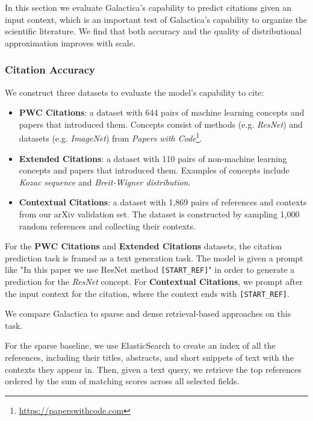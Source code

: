  In this section we evaluate Galactica's capability to predict citations given an input context, which is an important test of Galactica's capability to organize the scientific literature. We find that both accuracy and the quality of distributional approximation improves with scale.

{\subsubsection{Citation Accuracy}

We construct three datasets to evaluate the model's capability to cite:

\begin{itemize}
    \item \textbf{PWC Citations}: a dataset with 644 pairs of machine learning concepts and papers that introduced them. Concepts consist of methods (e.g. \textit{ResNet}) and datasets (e.g. \textit{ImageNet}) from \textit{Papers with Code}\footnote{\href{https://paperswithcode.com}{https://paperswithcode.com}}. 
    \item \textbf{Extended Citations}: a dataset with 110 pairs of non-machine learning concepts and papers that introduced them. Examples of concepts include \textit{Kozac sequence} and \textit{Breit-Wigner distribution}.
    \item \textbf{Contextual Citations}: a dataset with 1,869 pairs of references and contexts from our arXiv validation set. The dataset is constructed by sampling 1,000 random references and collecting their contexts.
\end{itemize}

For the \textbf{PWC Citations} and \textbf{Extended Citations} datasets, the citation prediction task is framed as a text generation task. The model is given a prompt like "In this paper we use ResNet method \texttt{[START\_REF]}" in order to generate a prediction for the \textit{ResNet} concept. For \textbf{Contextual Citations}, we prompt after the input context for the citation, where the context ends with \verb|[START_REF]|. 

We compare Galactica to sparse and dense retrieval-based approaches on this task. 

For the sparse baseline, we use ElasticSearch to create an index of all the references, including their titles, abstracts, and short snippets of text with the contexts they appear in. Then, given a text query, we retrieve the top references ordered by the sum of matching scores across all selected fields.

}
